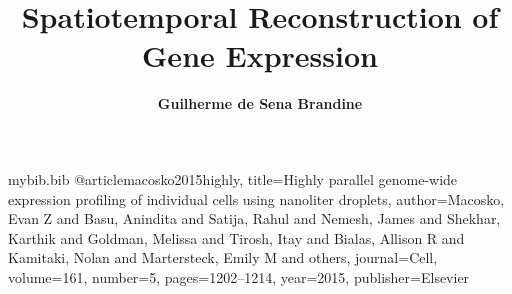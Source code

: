 \RequirePackage{filecontents}
\begin{filecontents}{mybib.bib}
@article{macosko2015highly,
  title={Highly parallel genome-wide expression profiling of individual cells using nanoliter droplets},
  author={Macosko, Evan Z and Basu, Anindita and Satija, Rahul and Nemesh, James and Shekhar, Karthik and Goldman, Melissa and Tirosh, Itay and Bialas, Allison R and Kamitaki, Nolan and Martersteck, Emily M and others},
  journal={Cell},
  volume={161},
  number={5},
  pages={1202--1214},
  year={2015},
  publisher={Elsevier}
}
\end{filecontents}

\documentclass[11pt]{article}
\usepackage{fullpage,
			times,
			namedplus,
		   }



\title{\bf Spatiotemporal Reconstruction of Gene Expression}
\author{\bf Guilherme de Sena Brandine}



\maketitle
\section{Introduction}
Many biological experiments are capable of giving detailed insights on the gene expression mechanisms governing complex systems at a molecular level. Two particular technologies in this context are:\\

